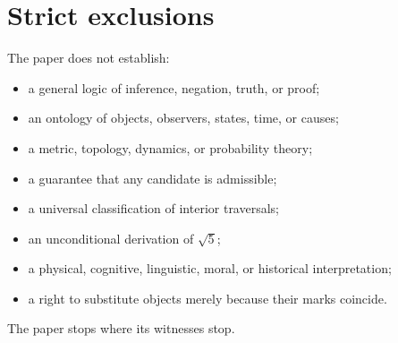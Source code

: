 \documentclass[11pt,letterpaper]{article}
\theoremstyle{constraintstyle}
\begin{document}
\section{Strict exclusions}

The paper does not establish:
\begin{itemize}
  \item a general logic of inference, negation, truth, or proof;
  \item an ontology of objects, observers, states, time, or causes;
  \item a metric, topology, dynamics, or probability theory;
  \item a guarantee that any candidate is admissible;
  \item a universal classification of interior traversals;
  \item an unconditional derivation of $\sqrt5$;
  \item a physical, cognitive, linguistic, moral, or historical interpretation;
  \item a right to substitute objects merely because their marks coincide.
\end{itemize}

The paper stops where its witnesses stop.
\end{document}
